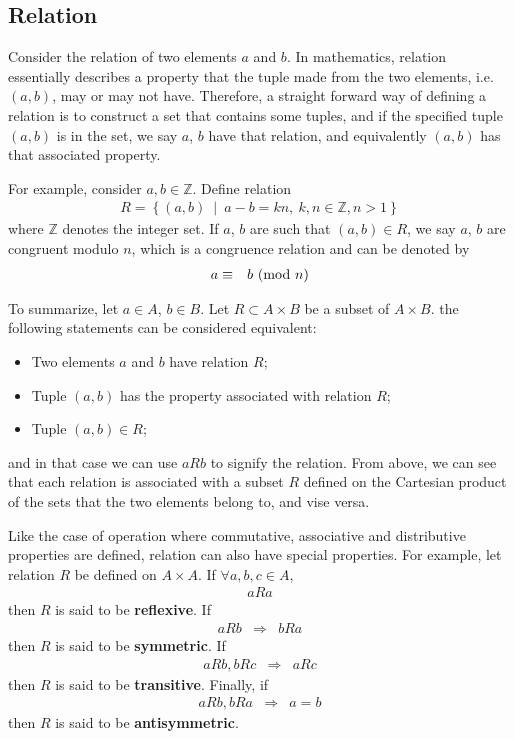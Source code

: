 \subsection{Relation}

Consider the relation of two elements $a$ and $b$. In mathematics, relation essentially describes a property that the tuple made from the two elements, i.e. $(a,b)$, may or may not have. Therefore, a straight forward way of defining a relation is to construct a set that contains some tuples, and if the specified tuple $(a,b)$ is in the set, we say $a$, $b$ have that relation, and equivalently $(a,b)$ has that associated property.

For example, consider $a,b\in\mathbb{Z}$. Define relation
\begin{eqnarray}
	R = \left\{(a,b)~\middle|~a-b = kn,~k,n \in\mathbb{Z}, n>1\right\}
\end{eqnarray}
where $\mathbb{Z}$ denotes the integer set. If $a$, $b$ are such that $(a,b)\in R$, we say $a$, $b$ are congruent modulo $n$, which is a congruence relation and can be denoted by
\begin{eqnarray}
	a &\equiv& b~(\textup{mod}~n) \nonumber
\end{eqnarray}

To summarize, let $a\in A$, $b\in B$. Let $R\subset A\times B$ be a subset of $A\times B$. the following statements can be considered equivalent:
\begin{itemize}
	\item Two elements $a$ and $b$ have relation $R$;
	\item Tuple $(a,b)$ has the property associated with relation $R$;
	\item Tuple $(a,b) \in R$;
\end{itemize}
and in that case we can use $aRb$ to signify the relation. From above, we can see that each relation is associated with a subset $R$ defined on the Cartesian product of the sets that the two elements belong to, and vise versa.

Like the case of operation where commutative, associative and distributive properties are defined, relation can also have special properties. For example, let relation $R$ be defined on $A \times A$. If $\forall a,b,c \in A$,
\begin{eqnarray}
	aRa \nonumber
\end{eqnarray}
then $R$ is said to be \textbf{reflexive}. If
\begin{eqnarray}
	aRb &\Rightarrow& bRa \nonumber
\end{eqnarray}
then $R$ is said to be \textbf{symmetric}. If
\begin{eqnarray}
	aRb, bRc &\Rightarrow& aRc \nonumber 
\end{eqnarray}
then $R$ is said to be \textbf{transitive}. Finally, if
\begin{eqnarray}
	aRb, bRa &\Rightarrow& a=b \nonumber 
\end{eqnarray}
then $R$ is said to be \textbf{antisymmetric}.

